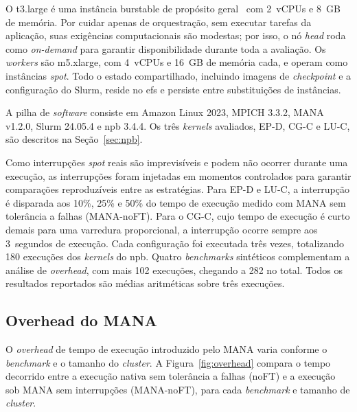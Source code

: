 \documentclass[a4paper,11pt]{article}
\begin{document}
            O t3.large é uma instância burstable de propósito
            geral~\cite{soda2025erad,soda2025wcc} com 2~vCPUs e 8~GB de memória.
            Por cuidar apenas de orquestração, sem executar tarefas da aplicação,
            suas exigências computacionais são modestas; por isso, o nó
            \textit{head} roda como \textit{on-demand} para garantir
            disponibilidade durante toda a avaliação. Os \textit{workers} são m5.xlarge, com 4~vCPUs
            e 16~GB de memória cada, e operam como instâncias \textit{spot}. Todo o
            estado compartilhado, incluindo imagens de \textit{checkpoint} e a
            configuração do Slurm, reside no \gls{efs} e persiste entre substituições
            de instâncias.

            A pilha de \textit{software} consiste em Amazon Linux 2023, MPICH 3.3.2,
            MANA v1.2.0, Slurm 24.05.4 e \gls{npb} 3.4.4. Os três \textit{kernels}
            avaliados, EP-D, CG-C e LU-C, são descritos na Seção~\ref{sec:npb}.

            Como interrupções \textit{spot} reais são imprevisíveis e podem não
            ocorrer durante uma execução, as interrupções foram injetadas em momentos
            controlados para garantir comparações reproduzíveis entre as estratégias.
            Para EP-D e LU-C, a interrupção é disparada aos 10\%, 25\% e 50\% do tempo
            de execução medido com MANA sem tolerância a falhas (MANA-noFT). Para o
            CG-C, cujo tempo de execução é curto demais para uma varredura
            proporcional, a interrupção ocorre sempre aos 3~segundos de execução. Cada
            configuração foi executada três vezes, totalizando 180 execuções dos
            \textit{kernels} do \gls{npb}. Quatro \textit{benchmarks} sintéticos
            complementam a análise de \textit{overhead}, com mais 102 execuções,
            chegando a 282 no total. Todos os resultados reportados são médias
            aritméticas sobre três execuções.

        \subsection{Overhead do MANA}
        \label{sec:overhead}

            O \textit{overhead} de tempo de execução introduzido pelo MANA varia conforme
            o \textit{benchmark} e o tamanho do \textit{cluster}. A
            Figura~\ref{fig:overhead} compara o tempo decorrido entre a execução nativa
            sem tolerância a falhas (noFT) e a execução sob MANA sem interrupções
            (MANA-noFT), para cada \textit{benchmark} e tamanho de \textit{cluster}.
\end{document}
